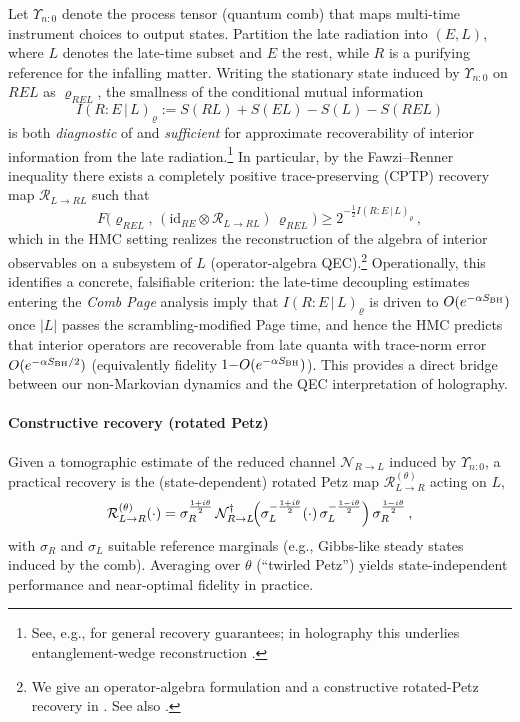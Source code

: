 \documentclass[a4paper,11pt]{article}
\newcommand{\eg}{e.g.\xspace}
\newcommand{\HMC}{\textup{\textsc{HMC}}\xspace}
\theoremstyle{plain}
\theoremstyle{definition}
\theoremstyle{remark}
\begin{document}
Let $\Upsilon_{n{:}0}$ denote the process tensor (quantum comb) that maps multi-time instrument choices to output states. Partition the late radiation into $(E,L)$, where $L$ denotes the late-time subset and $E$ the rest, while $R$ is a purifying reference for the infalling matter.
Writing the stationary state induced by $\Upsilon_{n{:}0}$ on $REL$ as $\varrho_{REL}$, the smallness of the conditional mutual information
\begin{equation}
I(R{:}E\,|\,L)_{\varrho} := S(RL) + S(EL) - S(L) - S(REL)
\end{equation}
is both \emph{diagnostic} of and \emph{sufficient} for approximate recoverability of interior information from the late radiation.\footnote{See, e.g., \citet{FawziRenner:2015} for general recovery guarantees; in holography this underlies entanglement-wedge reconstruction \cite{ADH:2015}.}
In particular, by the Fawzi--Renner inequality there exists a completely positive trace-preserving (CPTP) recovery map $\mathcal{R}_{L\to RL}$ such that
\begin{equation}
F\bigl(\varrho_{REL},\, (\mathrm{id}_{RE}\otimes \mathcal{R}_{L\to RL})\,\varrho_{REL}\bigr) \geq 2^{-\tfrac12 I(R{:}E\,|\,L)_{\varrho}}\,,
\end{equation}
which in the \HMC{} setting realizes the reconstruction of the algebra of interior observables on a subsystem of $L$ (operator-algebra QEC).\footnote{We give an operator-algebra formulation and a constructive rotated-Petz recovery in . See also \citet{Petz:1986,ADH:2015,Pastawski:2015}.}
Operationally, this identifies a concrete, falsifiable criterion: the late-time decoupling estimates entering the \emph{Comb Page} analysis imply that $I(R{:}E\,|\,L)_{\varrho}$ is driven to $O(e^{-\alpha S_{\rm BH}})$ once $|L|$ passes the scrambling-modified Page time, and hence the \HMC{} predicts that interior operators are recoverable from late quanta with trace-norm error $O(e^{-\alpha S_{\rm BH}/2})$ (equivalently fidelity $1{-}O(e^{-\alpha S_{\rm BH}})$).
This provides a direct bridge between our non-Markovian dynamics and the QEC interpretation of holography.

\paragraph{Constructive recovery (rotated Petz)}
Given a tomographic estimate of the reduced channel $\mathcal{N}_{R\to L}$ induced by $\Upsilon_{n{:}0}$, a practical recovery is the (state-dependent) rotated Petz map $\mathcal{R}^{(\theta)}_{L\to R}$ acting on $L$,
\begin{equation}
\mathcal{R}^{(\theta)}_{L\to R}(\cdot) = \sigma_R^{\frac{1+i\theta}{2}}\, \mathcal{N}_{R\to L}^{\dagger}\!\Bigl(\sigma_L^{-\frac{1+i\theta}{2}}(\cdot)\,\sigma_L^{-\frac{1-i\theta}{2}}\Bigr)\,\sigma_R^{\frac{1-i\theta}{2}}\,,
\end{equation}
with $\sigma_R$ and $\sigma_L$ suitable reference marginals (\eg, Gibbs-like steady states induced by the comb).
Averaging over $\theta$ (``twirled Petz'') yields state-independent performance and near-optimal fidelity in practice.
\end{document}
